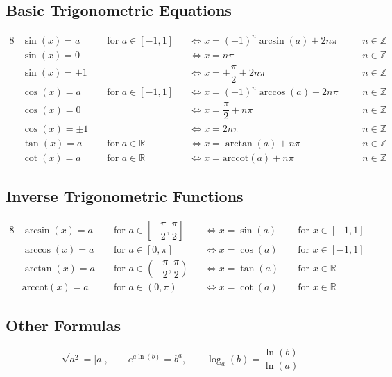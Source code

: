 \subsection{Basic Trigonometric Equations}
\begin{alignat*}{8}
    &\sin(x) = a 
    &&\text{ for } a \in [-1, 1]
    &&\Leftrightarrow x =(-1)^n\arcsin(a) + 2n\pi\quad 
    &&n \in \mathbb{Z} \\
    &\sin(x) = 0 
    &&
    &&\Leftrightarrow x = n\pi 
    &&n \in \mathbb{Z} \\
    &\sin(x) = \pm 1 &&
    &&\Leftrightarrow x = \pm\dfrac{\pi}{2} + 2n\pi
    &&n \in \mathbb{Z} \\
    &\cos(x) = a 
    &&\text{ for } a \in [-1, 1]
    &&\Leftrightarrow x =(-1)^n\arccos(a) + 2n\pi 
    &&n \in \mathbb{Z} \\
    &\cos(x) = 0
    &&
    &&\Leftrightarrow x = \dfrac{\pi}{2} + n\pi
    &&n \in \mathbb{Z} \\
    &\cos(x) = \pm 1
    &&
    &&\Leftrightarrow x = 2n\pi
    &&n \in \mathbb{Z} \\
    &\tan(x) = a
    &&\text{ for } a \in \mathbb{R}
    &&\Leftrightarrow x = \arctan(a) + n\pi
    &&n \in \mathbb{Z} \\
    &\cot(x) = a
    &&\text{ for } a \in \mathbb{R}
    &&\Leftrightarrow x = \text{arccot}(a) + n\pi
    &&n \in \mathbb{Z}
\end{alignat*}
    
\subsection{Inverse Trigonometric Functions}

\begin{alignat*}{8}
    &\arcsin(x) = a
    &&\text{ for } a \in [-\dfrac{\pi}{2}, \dfrac{\pi}{2}]
    &&\Leftrightarrow x = \sin(a)
    &&\text{ for } x \in [-1, 1] \\
    &\arccos(x) = a
    &&\text{ for } a \in [0, \pi]
    &&\Leftrightarrow x = \cos(a)
    &&\text{ for } x \in [-1, 1] \\
    &\arctan(x) = a
    &&\text{ for } a \in (-\dfrac{\pi}{2}, \dfrac{\pi}{2})
    &&\Leftrightarrow x = \tan(a)
    &&\text{ for } x \in \mathbb{R} \\
    &\text{arccot}(x) = a
    &&\text{ for } a \in (0, \pi)
    &&\Leftrightarrow x = \cot(a)
    &&\text{ for } x \in \mathbb{R}
\end{alignat*}

\subsection{Other Formulas}
\[
    \sqrt{a^2} = |a|, \qquad e^{a\ln(b)} = b^a, \qquad \log_a(b) = \dfrac{\ln(b)}{\ln(a)}
\]
\pagebreak

